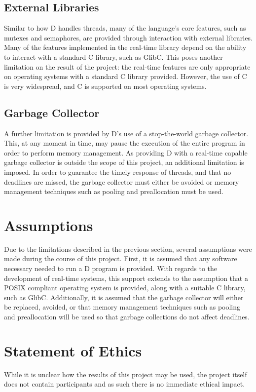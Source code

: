 \subsection{External Libraries}

Similar to how D handles threads, many of the language's core features, such as 
mutexes and semaphores, are provided through interaction with external libraries. 
Many of the features implemented in the real-time library depend on the ability 
to interact with a standard C library, such as GlibC. This poses another limitation 
on the result of the project: the real-time features are only appropriate on 
operating systems with a standard C library provided. However, the use of C is 
very widespread, and C is supported on most operating systems. 

\subsection{Garbage Collector}
A further limitation is provided by D's use of a stop-the-world garbage collector. 
This, at any moment in time, may pause the execution of the entire program in 
order to perform memory management. As providing D with a real-time capable 
garbage collector is outside the scope of this project, an additional limitation 
is imposed. In order to guarantee the timely response of threads, and that no 
deadlines are missed, the garbage collector must either be avoided or memory 
management techniques such as pooling and preallocation must be used. 

\section{Assumptions} %
Due to the limitations described in the previous section, several assumptions were 
made during the course of this project. 
First, it is assumed that any software necessary needed to run a D program is 
provided. With regards to the development of real-time systems, this support  
extends to the assumption that a POSIX compliant operating system is provided, 
along with a suitable C library, such as GlibC. 
Additionally, it is assumed that the garbage collector will either be replaced, 
avoided, or that memory management techniques such as pooling and preallocation 
will be used so that garbage collections do not affect deadlines. 

\section{Statement of Ethics}
While it is unclear how the results of this project may be used, the project 
itself does not contain participants and as such there is no immediate ethical impact.

